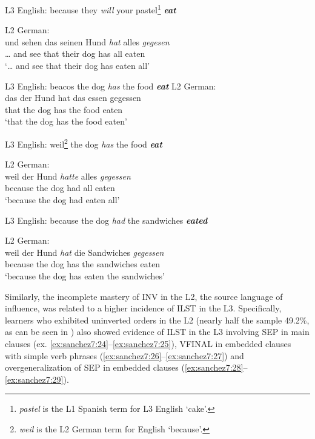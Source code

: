 \documentclass[output=paper,modfonts,nonflat, newtxmath]{langsci/langscibook}
\begin{document}
\ea%
  \label{ex:sanchez7:20}
  \begin{xlist}
  \ex L3 English: because they \textit{will} your pastel\footnote{\textit{pastel} is the L1 Spanish term for L3 English `cake'.} \textbf{\textit{eat}}

  \ex L2 German:\\
  \gll {\dots} und sehen das seinen Hund \textit{hat} alles  \textit{gegesen}\\
     {\dots} and see   that their dog   has  all  eaten \\
  \glt ‘{\dots} and see that their dog has eaten all’
  \end{xlist}
\ex %
  \label{ex:sanchez7:21}
  \begin{xlist}
  	\ex L3 English: beacos the dog \textit{has} the food \textbf{\textit{eat}}
  	\ex L2 German:\\
  	\gll das  der Hund  {hat}  das essen  {gegessen}\\
  		that  the dog   has  the food  eaten \\
  	\glt ‘that the dog has the food eaten’
  \end{xlist}
\ex %
  \label{ex:sanchez7:22}
  \begin{xlist}
  	\ex L3 English:  weil\footnote{\textit{weil} is the L2 German term for English `because'.} the dog \textit{has} the food \textbf{\textit{eat}}

  	\ex L2 German:\\
  	\gll weil der Hund \textit{hatte} alles  \textit{gegessen}\\
  		because  the dog   had   all   eaten\\
  	\glt ‘because the dog had eaten all’
  \end{xlist}
\ex %
  \label{ex:sanchez7:23}
  \begin{xlist}
  	\ex L3 English: because the dog \textit{had} the sandwiches \textbf{\textit{eated}}

  	\ex L2 German:\\
  	\gll weil     der Hund  \textit{hat}  die Sandwiches  \textit{gegessen}\\
   because  the dog   has  the sandwiches  eaten\\
  	\glt ‘because the dog has eaten the sandwiches’
  \end{xlist}
  \z

Similarly, the incomplete mastery of INV in the L2, the source language of influence, was related to a higher incidence of ILST in the L3. Specifically, learners who exhibited uninverted orders in the L2 (nearly half the sample 49.2\%, as can be seen in ) also showed evidence of ILST in the L3 involving SEP in main clauses (ex. \ref{ex:sanchez7:24}--\ref{ex:sanchez7:25}), VFINAL in embedded clauses with simple verb phrases (\ref{ex:sanchez7:26}--\ref{ex:sanchez7:27}) and overgeneralization of SEP in embedded clauses (\ref{ex:sanchez7:28}--\ref{ex:sanchez7:29}).
\end{document}
